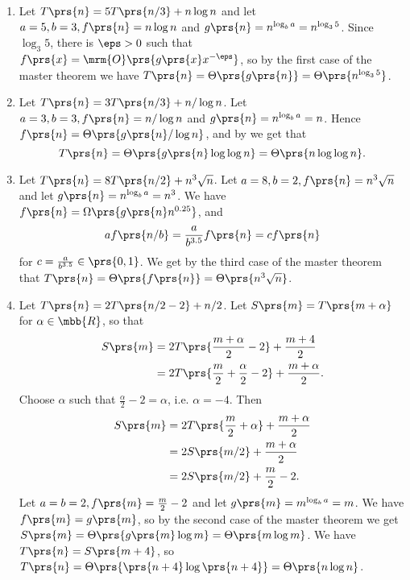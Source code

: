 \documentclass[oneside]{scrbook}
\theoremstyle{definition}
\begin{document}
\begin{problem}
\begin{enumerate}[label=\alph*.]
\item %
Let $T\prs{n} = 5T\prs{n/3} + n \log n$ and let $a = 5, b = 3, f\prs{n} = n \log n$ and $g\prs{n} = n^{\log_b a} = n^{\log_3 5}$. Since $\log_3 5$, there is $\eps > 0$ such that $f\prs{x} = \mrm{O}\prs{g\prs{x} x^{-\eps}}$, so by the first case of the master theorem we have $T\prs{n} = \Theta\prs{g\prs{n}} = \Theta\prs{n^{\log_3 5}}$.
\item %
Let $T\prs{n} = 3T\prs{n/3} + n/\log n$. Let $a = 3, b = 3, f\prs{n} = n/\log n$ and $g\prs{n} = n^{\log_b a} = n$. Hence $f\prs{n} = \Theta\prs{g\prs{n} / \log n}$, and by  we get that \[T\prs{n} = \Theta\prs{g\prs{n} \log \log n} = \Theta\prs{n \log \log n} \text{.}\]
\item %
Let $T\prs{n} = 8 T\prs{n/2} + n^3 \sqrt{n}$. Let $a = 8, b = 2, f\prs{n} = n^3 \sqrt{n}$ and let $g\prs{n} = n^{\log_b a} = n^3$. We have $f\prs{n} = \Omega\prs{g\prs{n} n^{0.25}}$, and
\begin{align*}
a f\prs{n/b} = \frac{a}{b^{3.5}} f\prs{n} = c f\prs{n}
\end{align*}
for $c = \frac{a}{b^{3.5}} \in \prs{0,1}$. We get by the third case of the master theorem that $T\prs{n} = \Theta\prs{f\prs{n}} = \Theta\prs{n^3 \sqrt{n}}$.
\item %
Let $T\prs{n} = 2T\prs{n/2 - 2} + n/2$.
Let $S\prs{m} = T\prs{m+\alpha}$ for $\alpha \in \mbb{R}$, so that
\begin{align*}
S\prs{m} &= 2 T\prs{\frac{m+\alpha}{2} - 2} + \frac{m+4}{2}
\\&= 2 T\prs{\frac{m}{2} + \frac{\alpha}{2} - 2} + \frac{m + \alpha}{2} \text{.}
\end{align*}
Choose $\alpha$ such that $\frac{\alpha}{2} - 2 = \alpha$, i.e. $\alpha = -4$. Then
\begin{align*}
S\prs{m} &= 2 T\prs{\frac{m}{2} + \alpha} + \frac{m + \alpha}{2}
\\&= 2 S\prs{m/2} + \frac{m + \alpha}{2}
\\&= 2 S\prs{m/2} + \frac{m}{2} - 2 \text{.}
\end{align*}
Let $a = b = 2, f\prs{m} = \frac{m}{2} - 2$ and let $g\prs{m} = m^{\log_b a} = m$. We have $f\prs{m} = g\prs{m}$, so by the second case of the master theorem we get $S\prs{m} = \Theta\prs{g\prs{m} \log m} = \Theta\prs{m \log m}$.
We have $T\prs{n} = S\prs{m + 4}$, so $T\prs{n} = \Theta\prs{\prs{n+4} \log\prs{n+4}} = \Theta\prs{n \log n}$.

\end{enumerate}
\end{problem}
\end{document}
